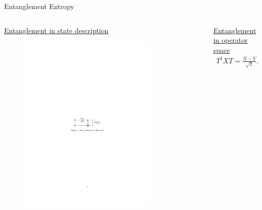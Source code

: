 \begin{frame}{Entanglement Entropy}
  \begin{columns}
    \begin{column}{0.45\textwidth}
      \begin{center}
        \underline{Entanglement in state description}
        \begin{figure}
          \vspace{-0.3cm}
          \includegraphics[width = 0.8\textwidth]{QS_Images/BeLL_State.pdf}
        \end{figure}
      \end{center}
    \end{column}


    \begin{column}{0.45\textwidth}
      \begin{center}
        \vspace{-0.45cm}
          \underline{Entanglement in operator space}
          \begin{align*}
            T^{\dagger} X T = \frac{X - Y}{\sqrt{2}}, && T^{\dagger} Y T = \frac{X + Y}{\sqrt{2}}
          \end{align*}
      \end{center}
      
    \end{column}
  \end{columns}


\end{frame}
